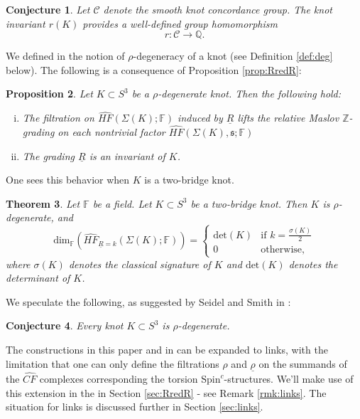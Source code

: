 \documentclass[11pt]{article}
\theoremstyle{plain} \newtheorem{thm}{Theorem}[subsection]
\theoremstyle{plain} \newtheorem{cor}[thm]{Corollary}
\theoremstyle{plain} \newtheorem{prop}[thm]{Proposition}
\theoremstyle{plain} \newtheorem{conj}[thm]{Conjecture}
\theoremstyle{plain} \newtheorem{lem}[thm]{Lemma}
\theoremstyle{definition} \newtheorem{df}[thm]{Definition}
\theoremstyle{remark} \newtheorem{rmk}[thm]{Remark}
\theoremstyle{remark} \newtheorem{obs}[thm]{Observation}
\newcommand{\DBC}[1]{\Sigma(#1)}
\newcommand{\red}[1]{\underline{#1}}
\numberwithin{equation}{section}
\begin{document}
\begin{conj}\label{conj:conc}
Let $\mathcal{C}$ denote the smooth knot concordance group.  The knot invariant $r(K)$ provides a well-defined group homomorphism
$$ r: \mathcal{C} \rightarrow \mathbb{Q}.$$
\end{conj}

We defined in \cite{et:R} the notion of $\rho$-degeneracy of a knot (see Definition \ref{def:deg} below).  The following is a consequence of Proposition \ref{prop:RredR}:
\begin{prop}\label{prop:Rdeg}
Let $K \subset S^{3}$ be a $\rho$-degenerate knot.  Then the following hold:
\begin{enumerate}[(i)]
\item The filtration on $\widehat{HF}(\DBC{K}; \mathbb{F})$ induced by $\red{R}$ lifts the relative Maslov $\mathbb{Z}$-grading on each nontrivial factor $\widehat{HF}(\DBC{K}, \mathfrak{s};\mathbb{F})$  \label{Rdeg:2}
\item The grading $\red{R}$ is an invariant of $K$.
\end{enumerate}
\end{prop}

One sees this behavior when $K$ is a two-bridge knot.

\begin{thm}\label{thm:Rsignthm}
Let $\mathbb{F}$ be a field.  Let $K \subset S^{3}$ be a two-bridge knot.  Then $K$ is $\rho$-degenerate, and
\begin{equation*}
\text{dim}_{\mathbb{F}}\left( \widehat{HF}_{\red{R} = k} (\DBC{K}; \mathbb{F}) \right)= \begin{cases}
\text{det}(K)& \text{if } k = \frac{\sigma(K)}{2}\\
0 & \text{otherwise},
\end{cases}
\end{equation*}
where $\sigma(K)$ denotes the classical signature of $K$ and $\text{det}(K)$ denotes the determinant of $K$.
\end{thm}

We speculate the following, as suggested by Seidel and Smith in \cite{ss:R2}:

\begin{conj}\label{conj:ss}
Every knot $K \subset S^{3}$ is $\rho$-degenerate.
\end{conj}

The constructions in this paper and in \cite{et:R} can be expanded to links, with the limitation that one can only define the filtrations $\rho$ and $\red{\rho}$ on the summands of the $\widehat{CF}$ complexes corresponding the torsion $\text{Spin}^{c}$-structures.  We'll make use of this extension in the in Section \ref{sec:RredR} - see Remark \ref{rmk:links}.  The situation for links is discussed further in Section \ref{sec:links}.
\end{document}
